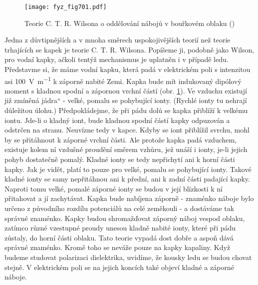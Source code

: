     \begin{figure}[ht!] %
      \centering
      \texttt{[image: fyz\_fig701.pdf]}
      \caption{Teorie C. T. R. Wilsona o oddělování nábojů v bouřkovém oblaku
               (\cite[s.~707]{Feynman02})}
      \label{fyz:fig701}
    \end{figure}

    Jedna z důvtipnějších a v mnoha směrech uspokojivějších teorií než teorie trhajících se kapek je
    teorie C. T. R. Wilsona. Popíšeme ji, podobně jako Wilson, pro vodní kapky, ačkoli tentýž
    mechanismus je uplatněn i v případě ledu. Představme si, že máme vodní kapku, která padá v
    elektrickém poli s intenzitou asi \SI{100}{\V\per\m} k záporně nabité Zemi. Kapka bude mít
    indukovaný dipólový moment s kladnou spodní a zápornou vrchní částí (obr. \ref{fyz:fig701}). Ve
    vzduchu existují již zmíněná jádra“ - velké, pomalu se pohybující ionty. (Rychlé ionty tu
    nehrají důležitou úlohu.) Předpokládejme, že při pádu dolů se kapka přiblíží k velkému iontu.
    Jde-li o kladný iont, bude kladnou spodní částí kapky odpuzován a odstrčen na stranu. Neuvízne
    tedy v kapce. Kdyby se iont přiblížil svrchu, mohl by se přitáhnout k záporné vrchní části. Ale
    protože kapka padá vzduchem, existuje kolem ní vzdušné proudění směrem vzhůru, jež unáší i
    ionty, je-li jejich pohyb dostatečně pomalý. Kladné ionty se tedy nepřichytí ani k horní části
    kapky. Jak je vidět, platí to pouze pro velké, pomalu se pohybující ionty. Takové kladné ionty
    se samy nepřitáhnou ani k přední, ani k zadní části padající kapky. Naproti tomu velké, pomalé
    záporné ionty se budou v její blízkosti k ní přitahovat a jí zachytávat. Kapka bude nabíjena
    záporně - znaménko náboje bylo určeno z původního rozdílu potenciálů na celé zeměkouli - a
    dostáváme tak správné znaménko. Kapky budou shromažďovat záporný náboj vespod oblaku, zatímco
    různé vzestupné proudy unesou kladně nabité ionty, které při pádu zůstaly, do horní části
    oblaku. Tato teorie vypadá dost dobře a aspoň dává správné znaménko. Kromě toho se neváže pouze
    na kapky kapaliny. Když budeme studovat polarizaci dielektrika, uvidíme, že kousky ledu se budou
    chovat stejně. V elektrickém poli se na jejich koncích také objeví kladné a záporné náboje.

